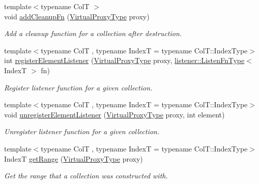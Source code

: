 \begin{DoxyCompactItemize}
{\footnotesize template$<$typename ColT $>$ }\\void \hyperlink{structvt_1_1vrt_1_1collection_1_1_collection_manager_a3ef00b90a3a2d066a7f83b9c32b301d2}{add\+Cleanup\+Fn} (\hyperlink{namespacevt_a1b417dd5d684f045bb58a0ede70045ac}{Virtual\+Proxy\+Type} proxy)
\begin{DoxyCompactList}\small\item\em Add a cleanup function for a collection after destruction. \end{DoxyCompactList}\item 
{\footnotesize template$<$typename ColT , typename IndexT  = typename Col\+T\+::\+Index\+Type$>$ }\\int \hyperlink{structvt_1_1vrt_1_1collection_1_1_collection_manager_a790738e12739058e7a09b4a3246169e8}{register\+Element\+Listener} (\hyperlink{namespacevt_a1b417dd5d684f045bb58a0ede70045ac}{Virtual\+Proxy\+Type} proxy, \hyperlink{namespacevt_1_1vrt_1_1collection_1_1listener_a62d04c44a3c187eae66bdba2090b4505}{listener\+::\+Listen\+Fn\+Type}$<$ IndexT $>$ fn)
\begin{DoxyCompactList}\small\item\em Register listener function for a given collection. \end{DoxyCompactList}\item 
{\footnotesize template$<$typename ColT , typename IndexT  = typename Col\+T\+::\+Index\+Type$>$ }\\void \hyperlink{structvt_1_1vrt_1_1collection_1_1_collection_manager_aecfd5c34b6d0b6781d3bb089ba1ae547}{unregister\+Element\+Listener} (\hyperlink{namespacevt_a1b417dd5d684f045bb58a0ede70045ac}{Virtual\+Proxy\+Type} proxy, int element)
\begin{DoxyCompactList}\small\item\em Unregister listener function for a given collection. \end{DoxyCompactList}\item 
{\footnotesize template$<$typename ColT , typename IndexT  = typename Col\+T\+::\+Index\+Type$>$ }\\IndexT \hyperlink{structvt_1_1vrt_1_1collection_1_1_collection_manager_a9259954aca1df3a68ad1d0a730687612}{get\+Range} (\hyperlink{namespacevt_a1b417dd5d684f045bb58a0ede70045ac}{Virtual\+Proxy\+Type} proxy)
\begin{DoxyCompactList}\small\item\em Get the range that a collection was constructed with. \end{DoxyCompactList}\item 

\end{DoxyCompactItemize}
